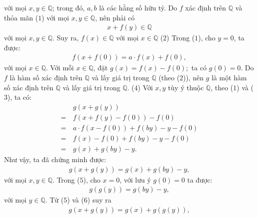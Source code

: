 \begin{multicols}{2}
	với mọi $x,y \in \mathbb{Q}$; trong đó, $a, b$ là các hằng số hữu tỷ.
	\vskip 0.05cm
	Do $f$  xác định trên  $\mathbb{Q}$ và thỏa mãn ($1$) với mọi  $x,y \in \mathbb{Q}$, nên phải có
	\begin{align*}
		x + f(y) \in \mathbb{Q}
	\end{align*}
	với mọi  $x, y \in \mathbb{Q}$.
	\vskip 0.05cm
	Suy ra, $f(x) \in \mathbb{Q}$  với mọi $x \in \mathbb{Q}$ \hfill ($2$)
	\vskip 0.05cm
	Trong ($1$), cho $y = 0$, ta được:
	\begin{align*}
		f\left( {x + f\left( 0 \right)} \right) = a \cdot f\left( x \right) + f\left( 0 \right), \tag{$3$}
	\end{align*}
	với mọi $x \in \mathbb{Q}$.
	\vskip 0.05cm
	Với mỗi  $x \in \mathbb{Q}$, đặt $g\left( x \right) = f\left( x \right) - f\left( 0 \right);$  ta có $g(0) = 0$.
	\vskip 0.05cm 
	Do $f$  là hàm số xác định trên $\mathbb{Q}$ và lấy giá trị trong  $\mathbb{Q}$ (theo ($2$)), nên $g$ là một hàm số xác định trên  $\mathbb{Q}$ và lấy giá trị trong $\mathbb{Q}$. \hfill ($4$)
	\vskip 0.05cm
	Với $x, y$ tùy ý thuộc  $\mathbb{Q}$, theo ($1$) và ($3$), ta có:
	\begin{align*}
			&g\left( {x + g\left( y \right)} \right) \\
			= \,&f\left( {x + f\left( y \right) - f\left( 0 \right)} \right) - f\left( 0 \right) \\
			= \,&a \cdot f\left( {x - f\left( 0 \right)} \right) + f\left( {by} \right) - y - f\left( 0 \right)\\
			 = \,&f\left( x \right) - f\left( 0 \right) + f\left( {by} \right) - y - f\left( 0 \right) \\
			 = \,&g\left( x \right) + g\left( {by} \right) - y.
	\end{align*}
	Như vậy, ta đã chứng minh được:
	\begin{align*}
		g\left( {x + g\left( y \right)} \right) = g\left( x \right) + g\left( {by} \right) - y, \tag{$5$}
	\end{align*}
	với mọi $x,y \in \mathbb{Q}$.
	\vskip 0.05cm
	Trong ($5$), cho $x = 0$, với lưu ý $g(0) = 0$  ta được:
	\begin{align*}
		g\left( {g\left( y \right)} \right) = g\left( {by} \right) - y, \tag{$6$}
	\end{align*}
	với mọi $y \in \mathbb{Q}$. 
	\vskip 0.05cm
	Từ ($5$) và ($6$) suy ra
	\begin{align*}
		g\left( {x + g\left( y \right)} \right) = g\left( x \right) + g\left( {g\left( y \right)} \right), \tag{$7$}
	\end{align*}

\end{multicols}
